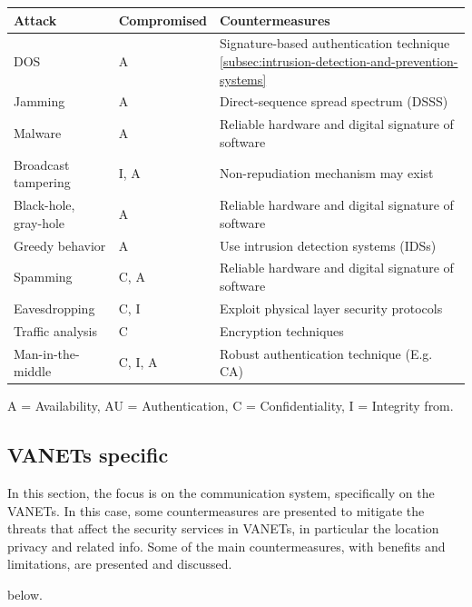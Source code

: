 \begin{table}[h]
    \centering
    \begin{tabular}{|l|l|l|}
        \hline
        \textbf{Attack} & \textbf{Compromised} & \textbf{Countermeasures} \\ \hline
        DOS & A & Signature-based authentication technique \ref{subsec:intrusion-detection-and-prevention-systems} \\ \hline
        Jamming & A & Direct-sequence spread spectrum (DSSS\cite{wang2022when}) \\ \hline
        Malware & A & Reliable hardware and digital signature of software \\ \hline
        Broadcast tampering & I, A & Non-repudiation mechanism may exist \\ \hline
        Black-hole, gray-hole & A & Reliable hardware and digital signature of software \\ \hline
        Greedy behavior & A & Use intrusion detection systems (IDSs) \\ \hline
        Spamming & C, A & Reliable hardware and digital signature of software \\ \hline
        Eavesdropping & C, I & Exploit physical layer security protocols \\ \hline
        Traffic analysis & C & Encryption techniques \\ \hline
        Man-in-the-middle & C, I, A & Robust authentication technique (E.g. CA) \\ \hline
    \end{tabular}
    \label{tab:Summary of Attacks and Countermeasures}
\end{table}
A = Availability, AU = Authentication, C = Confidentiality, I = Integrity
from\cite{sheikh2019comprehensive}.

\subsection{VANETs specific}\label{subsec:v2x-communication-and-network}

In this section, the focus is on the communication system, specifically on the VANETs.
In this case, some countermeasures are presented to mitigate the threats that affect the security services in VANETs, in particular the location privacy and related info.
Some of the main countermeasures, with benefits and limitations, are presented and discussed.


below\cite{macena2023cybersecurity}.


